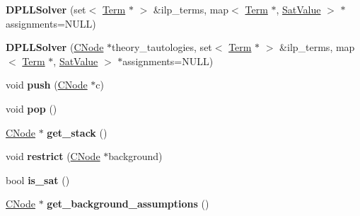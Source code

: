 \begin{DoxyCompactItemize}
\item 
\hypertarget{classDPLLSolver_aaabd090084e867fb00c5ebb7ff82fef2}{{\bfseries \-D\-P\-L\-L\-Solver} (set$<$ \hyperlink{classTerm}{\-Term} $\ast$ $>$ \&ilp\-\_\-terms, map$<$ \hyperlink{classTerm}{\-Term} $\ast$, \hyperlink{classSatValue}{\-Sat\-Value} $>$ $\ast$assignments=\-N\-U\-L\-L)}\label{classDPLLSolver_aaabd090084e867fb00c5ebb7ff82fef2}

\item 
\hypertarget{classDPLLSolver_a610cf2273c5dc565c769c78cbf8c4901}{{\bfseries \-D\-P\-L\-L\-Solver} (\hyperlink{classCNode}{\-C\-Node} $\ast$theory\-\_\-tautologies, set$<$ \hyperlink{classTerm}{\-Term} $\ast$ $>$ \&ilp\-\_\-terms, map$<$ \hyperlink{classTerm}{\-Term} $\ast$, \hyperlink{classSatValue}{\-Sat\-Value} $>$ $\ast$assignments=\-N\-U\-L\-L)}\label{classDPLLSolver_a610cf2273c5dc565c769c78cbf8c4901}

\item 
\hypertarget{classDPLLSolver_ab6704d3098036e50cbc2cf6417d6a478}{void {\bfseries push} (\hyperlink{classCNode}{\-C\-Node} $\ast$c)}\label{classDPLLSolver_ab6704d3098036e50cbc2cf6417d6a478}

\item 
\hypertarget{classDPLLSolver_a8e30125c0474b450d5639dd4353b5828}{void {\bfseries pop} ()}\label{classDPLLSolver_a8e30125c0474b450d5639dd4353b5828}

\item 
\hypertarget{classDPLLSolver_a7da903735d63fb5a39160f1c564c7dfa}{\hyperlink{classCNode}{\-C\-Node} $\ast$ {\bfseries get\-\_\-stack} ()}\label{classDPLLSolver_a7da903735d63fb5a39160f1c564c7dfa}

\item 
\hypertarget{classDPLLSolver_a4c9e846203c9f0641a6aa88ffbe62d42}{void {\bfseries restrict} (\hyperlink{classCNode}{\-C\-Node} $\ast$background)}\label{classDPLLSolver_a4c9e846203c9f0641a6aa88ffbe62d42}

\item 
\hypertarget{classDPLLSolver_aa5b5907b0ca90447bd2fd57dc3a20b61}{bool {\bfseries is\-\_\-sat} ()}\label{classDPLLSolver_aa5b5907b0ca90447bd2fd57dc3a20b61}

\item 
\hypertarget{classDPLLSolver_ad631c1d00ab91fd8f62192cbd95ba21c}{\hyperlink{classCNode}{\-C\-Node} $\ast$ {\bfseries get\-\_\-background\-\_\-assumptions} ()}\label{classDPLLSolver_ad631c1d00ab91fd8f62192cbd95ba21c}


\end{DoxyCompactItemize}
